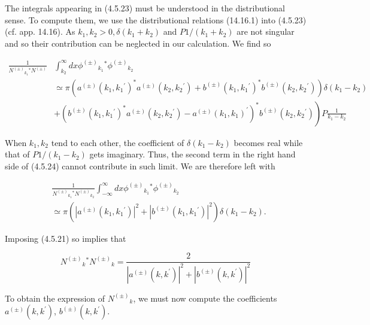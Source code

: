 \documentclass{article}
\begin{document}
The integrals appearing in (4.5.23) must be understood in the distributional sense. To compute them, we use the distributional relations (14.16.1) into (4.5.23) (cf. app. 14.16). As $k_{1}, k_{2}>0, \delta\left(k_{1}+k_{2}\right)$ and $P 1 /\left(k_{1}+k_{2}\right)$ are not singular and so their contribution can be neglected in our calculation. We find so
 
\begin{align*}
\frac{1}{N^{( \pm)}{ }_{k_{1}}{ }^{*} N^{( \pm)}} & \int_{k_{2}}^{\infty} d x \phi^{( \pm)}{ }_{k_{1}}{ }^{*} \phi^{( \pm)}{ }_{k_{2}}  \tag{4.5.24}\\
& \simeq \pi\left(a^{( \pm)}\left(k_{1}, k_{1}{ }^{\prime}\right)^{*} a^{( \pm)}\left(k_{2}, k_{2}{ }^{\prime}\right)+b^{( \pm)}\left(k_{1}, k_{1}{ }^{\prime}\right)^{*} b^{( \pm)}\left(k_{2}, k_{2}{ }^{\prime}\right)\right) \delta\left(k_{1}-k_{2}\right) \\
& \left.+\left(b^{( \pm)}\left(k_{1}, k_{1}{ }^{\prime}\right)^{*} a^{( \pm)}\left(k_{2}, k_{2}{ }^{\prime}\right)-a^{( \pm)}\left(k_{1}, k_{1}\right)^{\prime}\right)^{*} b^{( \pm)}\left(k_{2}, k_{2}{ }^{\prime}\right)\right) P \frac{1}{k_{1}-k_{2}}
\end{align*}
 

When $k_{1}, k_{2}$ tend to each other, the coefficient of $\delta\left(k_{1}-k_{2}\right)$ becomes real while that of $P 1 /\left(k_{1}-k_{2}\right)$ gets imaginary. Thus, the second term in the right hand side of (4.5.24) cannot contribute in such limit. We are therefore left with
 
\begin{align*}
& \frac{1}{N^{( \pm)}{ }_{k_{1}}{ }^{*} N^{( \pm)}{ }_{k_{2}}} \int_{-\infty}^{\infty} d x \phi^{( \pm)}{ }_{k_{1}}{ }^{*} \phi^{( \pm)}{ }_{k_{2}}  \tag{4.5.25}\\
& \simeq \pi\left(\left|a^{( \pm)}\left(k_{1}, k_{1}{ }^{\prime}\right)\right|^{2}+\left|b^{( \pm)}\left(k_{1}, k_{1}{ }^{\prime}\right)\right|^{2}\right) \delta\left(k_{1}-k_{2}\right) .
\end{align*}
 

Imposing (4.5.21) so implies that
 
\begin{equation*}
N^{( \pm)}{ }_{k}{ }^{*} N^{( \pm)}{ }_{k}=\frac{2}{\left|a^{( \pm)}\left(k, k^{\prime}\right)\right|^{2}+\left|b^{( \pm)}\left(k, k^{\prime}\right)\right|^{2}} \tag{4.5.26}
\end{equation*}
 

To obtain the expression of $N^{( \pm)}{ }_{k}$, we must now compute the coefficients $a^{( \pm)}\left(k, k^{\prime}\right)$, $b^{( \pm)}\left(k, k^{\prime}\right)$.
\end{document}
